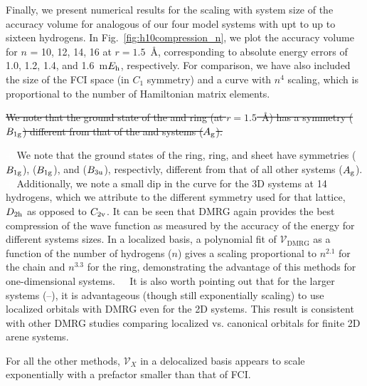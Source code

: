 \documentclass[aip,jcp,amsmath,amssymb, preprint]{revtex4-1}
\newcommand*{\Eh}{$E_{\rm h}$\xspace}
\newcommand{\add}[1]{\colorbox{goodgreen}{\textcolor{white}{\footnotesize  \fontfamily{phv}\selectfont +}}
    \textcolor{goodgreen}{{#1}}\xspace}
\newcommand{\addnew}[1]{\colorbox{goodorange}{\textcolor{white}{\footnotesize  \fontfamily{phv}\selectfont +}}
\textcolor{goodorange}{{#1}}\xspace
}
\newcommand{\remove}[1]{
\colorbox{goodred}{\textcolor{white}{\footnotesize  \fontfamily{phv}\selectfont \textminus\vphantom{c}}}
\textcolor{goodred}{\sout{#1}}\xspace
}
\begin{document}
Finally, we present numerical results for the scaling with system size of the accuracy volume for analogous of our four model systems with upt to up to sixteen hydrogens.
In Fig.~\ref{fig:h10compression_n}, we plot the accuracy volume for $n$ = 10, 12, 14, 16 at $r=1.5$~{\AA}, corresponding to absolute energy errors of 1.0, 1.2, 1.4, and 1.6~m\Eh, respectively.
For comparison, we have also included the size of the FCI space (in $C_1$ symmetry) and a curve with $n^4$ scaling, which is proportional to the number of Hamiltonian matrix elements.
\remove{We note that the ground state of the  and ring (at $r=1.5$~{\AA}) has a symmetry ($B_{1\rm g}$) different from that of the \ce{H10} and \ce{H14} systems ($A_{\rm g}$).}
\add{We note that the ground states of the  ring, \ce{H16} ring, and \ce{H16} sheet have symmetries ($B_{1\rm g}$), ($B_{1\rm g}$), and ($B_{3\rm u}$), respectivly, different from that of all other systems ($A_{\rm g}$).}
\add{Additionally, we note a small dip in the curve for the 3D systems at 14 hydrogens, which we attribute to the different symmetry used for that lattice, $D_{2\rm h}$ as opposed to $C_{2\rm v}$.} 
It can be seen that DMRG again provides the best compression of the wave function as measured by the accuracy of the energy for different systems sizes.
In a localized basis, a polynomial fit of $\mathcal{V}_\text{DMRG}$  as a function of the number of hydrogens ($n$) gives a scaling proportional to $n^{2.1}$ for the chain and $n^{3.3}$ for the ring, demonstrating the advantage of this methods for one-dimensional systems.
\addnew{It is also worth pointing out that for the larger systems (\ce{H12}--\ce{H16}), it is advantageous (though still exponentially scaling) to use localized orbitals with DMRG even for the 2D systems. This result is consistent with other DMRG studies comparing localized vs. canonical orbitals for finite 2D arene systems.\cite{Olivares2015TheAbinitio}}
For all the other methods, $\mathcal{V}_{X}$ in a delocalized basis appears to scale exponentially with a prefactor smaller than that of FCI.
\end{document}
